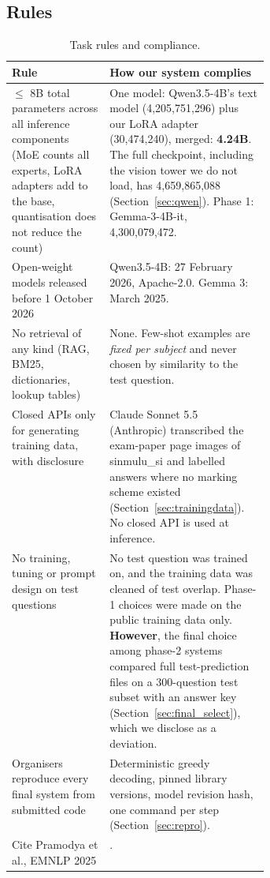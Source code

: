 \documentclass[10pt,a4paper]{article}
\begin{document}
\subsection{Rules}
\begin{table}[h]
\centering\small
\begin{tabularx}{\linewidth}{>{\raggedright\arraybackslash}p{0.38\linewidth}X}
\toprule
Rule & How our system complies\\
\midrule
$\le$ 8B total parameters across all inference components (MoE counts all experts, LoRA adapters add to the base,
quantisation does not reduce the count) & One model: Qwen3.5-4B's text model (4,205,751,296) plus our LoRA adapter
(30,474,240), merged: \textbf{4.24B}. The full checkpoint, including the vision tower we do not load, has 4,659,865,088
(Section~\ref{sec:qwen}). Phase 1: Gemma-3-4B-it, 4,300,079,472.\\
Open-weight models released before 1 October 2026 & Qwen3.5-4B: 27 February 2026, Apache-2.0. Gemma 3: March 2025.\\
No retrieval of any kind (RAG, BM25, dictionaries, lookup tables) & None. Few-shot examples are \emph{fixed per subject}
and never chosen by similarity to the test question.\\
Closed APIs only for generating training data, with disclosure & Claude Sonnet 5.5 (Anthropic) transcribed the
exam-paper page images of sinmulu\_si and labelled answers where no marking scheme existed (Section~\ref{sec:trainingdata}).
No closed API is used at inference.\\
No training, tuning or prompt design on test questions & No test question was trained on, and the training data was
cleaned of test overlap. Phase-1 choices were made on the public training data only. \textbf{However}, the final
choice among phase-2 systems compared full test-prediction files on a 300-question test subset with an answer key
(Section~\ref{sec:final_select}), which we disclose as a deviation.\\
Organisers reproduce every final system from submitted code & Deterministic greedy decoding, pinned library versions,
model revision hash, one command per step (Section~\ref{sec:repro}).\\
Cite Pramodya et al., EMNLP 2025 & \cite{pramodya2025}.\\
\bottomrule
\end{tabularx}
\caption{Task rules and compliance.}
\end{table}
\end{document}
